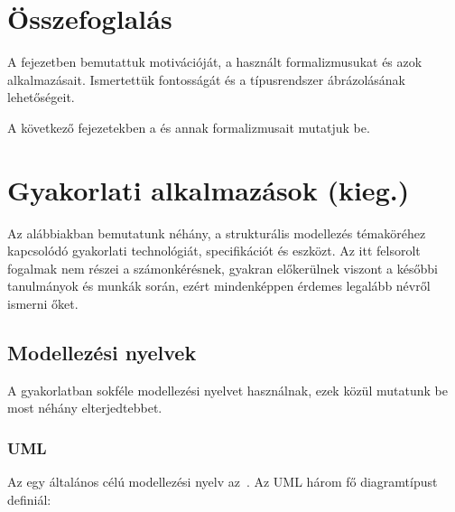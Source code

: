 


\section{Összefoglalás}

A fejezetben bemutattuk  motivációját, a használt formalizmusukat és azok alkalmazásait. Ismertettük  fontosságát és a típusrendszer ábrázolásának lehetőségeit.

A következő fejezetekben a  és annak formalizmusait mutatjuk be.


\section{Gyakorlati alkalmazások (kieg.)}

Az alábbiakban bemutatunk néhány, a strukturális modellezés témaköréhez kapcsolódó gyakorlati technológiát, specifikációt és eszközt. Az itt felsorolt fogalmak nem részei a számonkérésnek, gyakran előkerülnek viszont a későbbi tanulmányok és munkák során, ezért mindenképpen érdemes legalább névről ismerni őket.

\subsection{Modellezési nyelvek}

A gyakorlatban sokféle modellezési nyelvet használnak, ezek közül mutatunk be most néhány elterjedtebbet.

\subsubsection{UML}

Az  egy általános célú modellezési nyelv az~\cite{UML}. Az UML három fő diagramtípust definiál:

